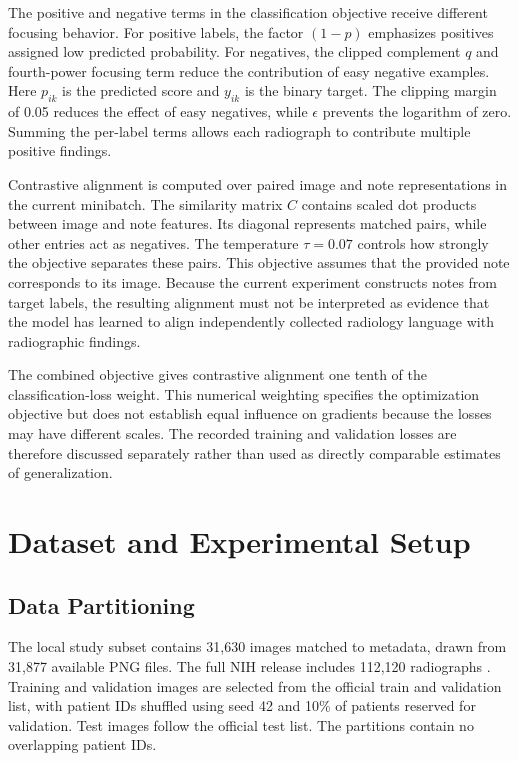 \documentclass[pdflatex,sn-mathphys-num]{sn-jnl}
\begin{document}
The positive and negative terms in the classification objective receive different focusing behavior. For positive labels, the factor $(1-p)$ emphasizes positives assigned low predicted probability. For negatives, the clipped complement $q$ and fourth-power focusing term reduce the contribution of easy negative examples. Here $p_{ik}$ is the predicted score and $y_{ik}$ is the binary target. The clipping margin of 0.05 reduces the effect of easy negatives, while $\epsilon$ prevents the logarithm of zero. Summing the per-label terms allows each radiograph to contribute multiple positive findings.

Contrastive alignment is computed over paired image and note representations in the current minibatch. The similarity matrix $C$ contains scaled dot products between image and note features. Its diagonal represents matched pairs, while other entries act as negatives. The temperature $\tau=0.07$ controls how strongly the objective separates these pairs. This objective assumes that the provided note corresponds to its image. Because the current experiment constructs notes from target labels, the resulting alignment must not be interpreted as evidence that the model has learned to align independently collected radiology language with radiographic findings.

The combined objective gives contrastive alignment one tenth of the classification-loss weight. This numerical weighting specifies the optimization objective but does not establish equal influence on gradients because the losses may have different scales. The recorded training and validation losses are therefore discussed separately rather than used as directly comparable estimates of generalization.

\section{Dataset and Experimental Setup}

\subsection{Data Partitioning}

The local study subset contains 31,630 images matched to metadata, drawn from 31,877 available PNG files. The full NIH release includes 112,120 radiographs \cite{nihdataset}. Training and validation images are selected from the official train and validation list, with patient IDs shuffled using seed 42 and 10\% of patients reserved for validation. Test images follow the official test list. The partitions contain no overlapping patient IDs.
\end{document}
